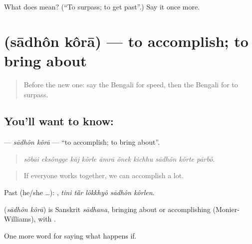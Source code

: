\begin{tcolorbox}[breakable,colback=teal!4,colframe=teal!35!black,title={Before you move on}]
What does   mean? (\textquotedblleft{}To surpass; to get past\textquotedblright{}.) Say it once more.
\end{tcolorbox}
\section[\texorpdfstring{\bn{সাধন} \bn{করা} (sādhôn kôrā)}{সাধন করা (sādhôn kôrā)}]{  (sādhôn kôrā) — to accomplish; to bring about}

\label{lesson:BN-C377-sadhon-kora}



\begin{quote}
Before the new one: say the Bengali for speed, then the Bengali for to surpass.
\end{quote}

\subsection*{You'll want to know:  }
\textbf{ } — \emph{sādhôn kôrā} — \textquotedblleft{}to accomplish; to bring about\textquotedblright{}.

\begin{quote}
         
\end{quote}

\begin{quote}
\emph{sôbāi eksôngge kāj kôrle āmrā ônek kichhu sādhôn kôrte pārbô.}
\end{quote}

\begin{quote}
If everyone works together, we can accomplish a lot.
\end{quote}

Past (he/she …):     , \emph{tini tā̃r lôkkhyô sādhôn kôrlen}.

\begin{cousinweb}
\textbf{ } (\emph{sādhôn kôrā}) is Sanskrit \emph{sādhana}, bringing about or accomplishing (Monier-Williams), with .
\end{cousinweb}

\begin{grammarlens}[title={What you've built}]
One more word for saying what happens if.
\end{grammarlens}

